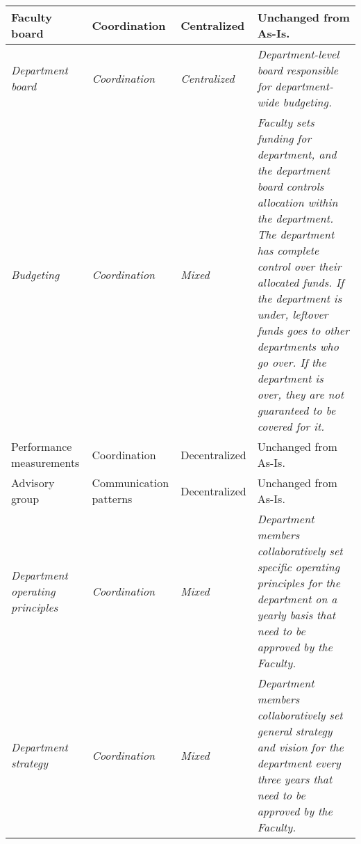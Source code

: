 \begin{center}
\begin{longtable}{ | p{} | p{}| p{} | p{}|}
 Faculty board &
 Coordination &
 Centralized &
 Unchanged from As-Is. \\
%
\hline
%
%
 \textit{Department board} &
 \textit{Coordination} &
 \textit{Centralized} &
 \textit{Department-level board responsible for department-wide budgeting.} \\
%
\hline
%
 \textit{Budgeting} &
 \textit{Coordination} &
 \textit{Mixed} &
 \textit{Faculty sets funding for department, and the department board controls allocation within the department. The department has complete control over their allocated funds. If the department is under, leftover funds goes to other departments who go over. If the department is over, they are not guaranteed to be covered for it.} \\
%
\hline
%
%
 Performance measurements &
 Coordination &
 Decentralized &
 Unchanged from As-Is.  \\
%
\hline
%
 Advisory group &
 Communication patterns &
 Decentralized &
 Unchanged from As-Is. \\
%
\hline
%
%
 \textit{Department operating principles} &
 \textit{Coordination} &
 \textit{Mixed} &
 \textit{Department members collaboratively set specific operating principles for the department on a yearly basis that need to be approved by the Faculty.} \\
%
\hline
%
%
 \textit{Department strategy} &
 \textit{Coordination} &
 \textit{Mixed} &
 \textit{Department members collaboratively set general strategy and vision for the department every three years that need to be approved by the Faculty.} \\
%
\hline

\end{longtable}
\end{center}


